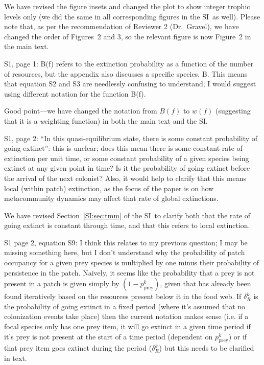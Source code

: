 \documentclass[11pt]{article}
\newcommand{\SI}{SI}
\newcommand{\us}{\rm \setlength{\leftskip}{0.3cm} \setlength{\rightskip}{0.3cm}}
\newcommand{\them}{\it \setlength{\leftskip}{0cm} \setlength{\rightskip}{0cm}}
\begin{document}
\us

We have revised the figure insets and changed the plot to show integer trophic levels only (we did the same in all corresponding figures in the \SI\ as well). Please note that, as per the recommendation of Reviewer 2 (Dr.~Gravel), we have changed the order of Figures~2 and 3, so the relevant figure is now Figure~2 in the main text.

\them

S1, page 1: B(f) refers to the extinction probability as a function of the number of resources, but the appendix also discusses a specific species, B. This means that equation S2 and S3 are needlessly confusing to understand; I would suggest using different notation for the function B(f). 

\us

Good point---we have changed the notation from $B(f)$ to $w(f)$ (suggesting that it is a \emph{w}eighting function) in both the main text and the \SI.

\them

S1, page 2: ``In this quasi-equilibrium state, there is some constant probability of going extinct'': this is unclear; does this mean there is some constant rate of extinction per unit time, or some constant probability of a given species being extinct at any given point in time? Is it the probability of going extinct before the arrival of the next colonist? Also, it would help to clarify that this means local (within patch) extinction, as the focus of the paper is on how metacommunity dynamics may affect that rate of global extinctions.

\us

We have revised Section~\ref{SI:sec:tmm} of the \SI\ to clarify both that the rate of going extinct is constant through time, and that this refers to local extinction.

\them

S1 page 2, equation S9: I think this relates to my previous question; I may be missing something here, but I don't understand why the probability of patch occupancy for a given prey species is multiplied by one minus their probability of persistence in the patch. Naively, it seems like the probability that a prey is not present in a patch is given simply by $(1-p_{\text{prey}}^k)$, given that has already been found iteratively based on the resources present below it in the food web. If $\delta_R^k$ is the probability of going extinct in a fixed period (where it's assumed that no colonization events take place) then the current notation makes sense (i.e. if a focal species only has one prey item, it will go extinct in a given time period if it's prey is not present at the start of a time period (dependent on $p_{\text{prey}}^k$) or if that prey item goes extinct during the period ($\delta_R^k$) but this needs to be clarified in text.
\end{document}
